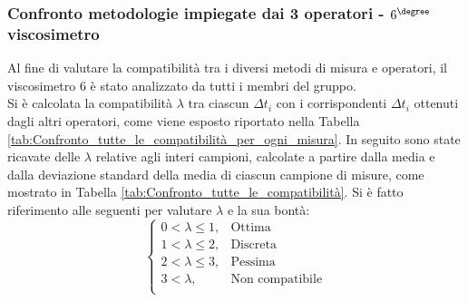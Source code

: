 \documentclass[a4paper,11pt,oneside]{article}
\begin{document}
\subsubsection*{Confronto metodologie impiegate dai 3 operatori - $6^{\degree}$ viscosimetro}%
Al fine di valutare la compatibilità tra i diversi metodi di misura e operatori, il viscosimetro 6 è stato analizzato da tutti i membri del gruppo.\\
Si è calcolata la compatibilità $\lambda$ tra ciascun $\Delta t_i$ con i corrispondenti $\Delta t_i$ ottenuti dagli  altri operatori, come viene esposto riportato nella Tabella \ref{tab:Confronto_tutte_le_compatibilità_per_ogni_misura}.
In seguito sono state ricavate delle $\lambda$ relative agli interi campioni, calcolate a partire dalla media e dalla deviazione standard della media di ciascun campione di misure, come mostrato in Tabella \ref{tab:Confronto_tutte_le_compatibilità}. Si è fatto riferimento alle seguenti per valutare $\lambda$ e la sua bontà:
\begin{equation*}%
    \label{eq:cases}
    \begin{cases}
    0<\lambda\leq 1, & \text{Ottima}\\
    1<\lambda\leq2, & \text{Discreta}\\
    2<\lambda\leq3, & \text{Pessima}\\
    3<\lambda, & \text{Non compatibile}\\
    \end{cases}
\end{equation*}


\begin{figure}[h!]
\small
    \centering
    \label{fig:comp}
\end{figure}
\end{document}
